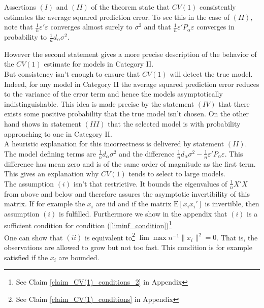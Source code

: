 \documentclass[Research_Module_ES.tex]{subfiles}
\begin{document}
Assertions $(I)$ and $(II)$ of the theorem state that $CV(1)$ consistently estimates the average squared prediction error. To see this in the case of $(II)$, note that $\frac{1}{n}\varepsilon'\varepsilon$ converges almost surely to $\sigma^2$ and that 
$\frac{1}{n}\varepsilon'P_\alpha\varepsilon$ converges in probability to $\frac{1}{n}d_\alpha\sigma^2$.\

However the second statement gives a more precise description of the behavior of the $CV(1)$ estimate for models in Category II. \\

But consistency isn't enough to ensure that $CV(1)$ will detect the true model. 
Indeed, for any model in Category II the average squared prediction error reduces to the variance of the error term and hence the models asymptotically indistinguishable. 
This idea is made precise by the statement $(IV)$ that there exists some positive probability that the true model isn't chosen. On the other hand \cite{shao} shows in statement $(III)$ that the selected model is with probability approaching to one in Category II.\\

A heuristic explanation for this incorrectness is delivered by statement $(II)$. The model defining terms are $\frac{1}{n}d_\alpha\sigma^2$ and the difference $\frac{1}{n}d_\alpha\sigma^2 - \frac{1}{n}\varepsilon'P_\alpha\varepsilon$. This difference has mean zero and is of the same order of magnitude as the first term. This gives an explanation why $CV(1)$ tends to select to large models.\\

The assumption $(i)$ isn't that restrictive. It bounds the eigenvalues of $\frac{1}{n}X'X$ from above and below and therefore assures the asymptotic invertibility of this matrix. If for example the $x_i$ are iid and if the matrix $\mathrm{E}[x_ix_i']$ is invertible, then assumption $(i)$ is fulfilled. Furthermore we show in the appendix that $(i)$ is a sufficient condition for condition (\ref{liminf_condition})\footnote{See Claim \ref{claim_CV(1)_conditions_2} in Appendix }\\

One can show that $(ii)$ is equivalent to\footnote{See Claim \ref{claim_CV(1)_conditions} in Appendix } 
$\lim \max n^{-1}\lVert x_i\rVert^2=0$. That is, the observations are allowed to grow but not too fast. This condition is for example satisfied if the $x_i$ are bounded.
\end{document}
